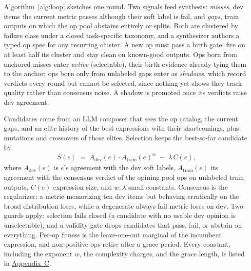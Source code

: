 \documentclass[letterpaper]{article} %
\begin{document}
Algorithm~\ref{alg:loop} sketches one round. Two signals feed synthesis: \emph{misses}, dev items the current metric passes although their soft label is fail, and \emph{gaps}, train outputs on which the op pool abstains entirely or splits. Both are clustered by failure class under a closed task-specific taxonomy, and a synthesizer authors a typed op spec for any recurring cluster. A new op must pass a birth gate: fire on at least half its cluster and stay clean on known-good outputs. Ops born from anchored misses enter \emph{active} (selectable), their birth evidence already tying them to the anchor; ops born only from unlabeled gaps enter as \emph{shadows}, which record verdicts every round but cannot be selected, since nothing yet shows they track quality rather than consensus noise. A shadow is promoted once its verdicts raise dev agreement.

Candidates come from an LLM composer that sees the op catalog, the current gaps, and an elite history of the best expressions with their shortcomings, plus mutations and crossovers of those elites. Selection keeps the best-so-far candidate by
\begin{equation}
\begin{split}
S(e) \;=\; A_{\mathrm{dev}}(e) \cdot A_{\mathrm{train}}(e)^{w} \;-\; \lambda\, C(e),
\end{split}
\label{eq:score}
\end{equation}
where $A_{\mathrm{dev}}(e)$ is $e$'s agreement with the dev soft labels, $A_{\mathrm{train}}(e)$ its agreement with the consensus verdict of the opining pool ops on unlabeled train outputs, $C(e)$ expression size, and $w, \lambda$ small constants. Consensus is the regularizer: a metric memorizing ten dev items but behaving erratically on the broad distribution loses, while a degenerate always-fail metric loses on dev. Two guards apply: selection fails closed (a candidate with no usable dev opinion is unselectable), and a validity gate drops candidates that pass, fail, or abstain on everything. Per-op fitness is the leave-one-out marginal of the incumbent expression, and non-positive ops retire after a grace period. Every constant, including the exponent $w$, the complexity charges, and the grace length, is listed in \hyperref[app:lang]{Appendix~C}.
\end{document}
